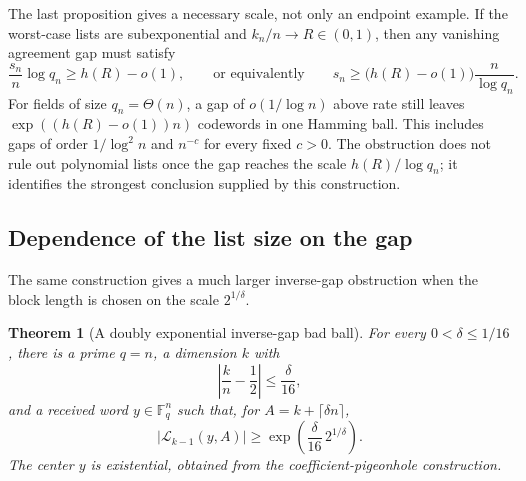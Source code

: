 \documentclass[11pt,letterpaper]{article}
\newtheorem{theorem}{Theorem}[section]
\theoremstyle{definition}
\newcommand{\F}{\mathbb{F}}
\newcommand{\List}{\mathcal{L}}
\begin{document}
The last proposition gives a necessary scale, not only an endpoint example.
If the worst-case lists are subexponential and \(k_n/n\to R\in(0,1)\), then
any vanishing agreement gap must satisfy
\begin{equation}
  \frac{s_n}{n}\log q_n\geq h(R)-o(1),
  \qquad\text{or equivalently}\qquad
  s_n\geq\bigl(h(R)-o(1)\bigr)\frac{n}{\log q_n}.
  \label{eq:necessary-shrinking-gap}
\end{equation}
For fields of size \(q_n=\Theta(n)\), a gap of
\(o(1/\log n)\) above rate still leaves
\(\exp((h(R)-o(1))n)\) codewords in one Hamming ball.  This includes gaps
of order \(1/\log^2 n\) and \(n^{-c}\) for every fixed \(c>0\).  The obstruction does
not rule out polynomial lists once the gap reaches the scale
\(h(R)/\log q_n\); it identifies the strongest conclusion supplied by this
construction.

\subsection{Dependence of the list size on the gap}

The same construction gives a much larger inverse-gap obstruction when the
block length is chosen on the scale \(2^{1/\delta}\).

\begin{theorem}[A doubly exponential inverse-gap bad ball]
\label{thm:doubly-exponential-gap-list}
For every \(0<\delta\le1/16\), there is a prime \(q=n\), a dimension \(k\)
with
\[
  \left|\frac kn-\frac12\right|\le\frac{\delta}{16},
\]
and a received word \(y\in\F_q^n\) such that, for
\(A=k+\lceil\delta n\rceil\),
\begin{equation}
  |\List_{k-1}(y,A)|
  \ge
  \exp\left(\frac{\delta}{16}\,2^{1/\delta}\right).
  \label{eq:doubly-exponential-gap-list}
\end{equation}
The center \(y\) is existential, obtained from the coefficient-pigeonhole
construction.
\end{theorem}
\end{document}
